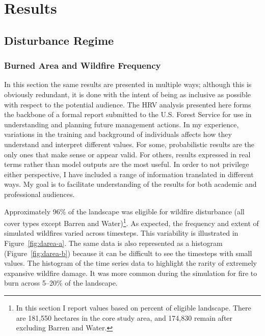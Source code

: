 \section{Results}
\label{sec:hrvresults}
\subsection{Disturbance Regime}

\subsubsection*{Burned Area and Wildfire Frequency}


In this section the same results are presented in multiple ways; although this is obviously redundant, it is done with the intent of being as inclusive as possible with respect to the potential audience. The HRV analysis presented here forms the backbone of a formal report submitted to the U.S. Forest Service for use in understanding and planning future management actions. In my experience, variations in the training and background of individuals affects how they understand and interpret different values. For some, probabilistic results are the only ones that make sense or appear valid. For others, results expressed in real terms rather than model outputs are the most useful. In order to not privilege either perspective, I have included a range of information translated in different ways. My goal is to facilitate understanding of the results for both academic and professional audiences.

Approximately 96\% of the landscape was eligible for wildfire disturbance (all cover types except Barren and Water)\footnote{In this section I report values based on percent of eligible landscape. There are 181,550 hectares in the core study area, and 174,830 remain after excluding Barren and Water.}. As expected, the frequency and extent of simulated wildfires varied across timesteps. This variability is illustrated in Figure~\ref{fig:darea-a}. The same data is also represented as a histogram (Figure~\ref{fig:darea-b}) because it can be difficult to see the timesteps with small values. The histogram of the time series data to highlight the rarity of extremely expansive wildfire damage. It was more common during the simulation for fire to burn across 5--20\% of the landscape.

